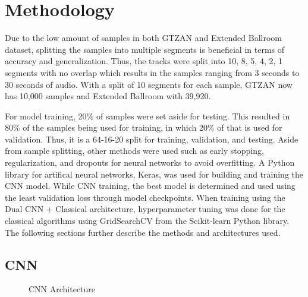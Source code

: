 \documentclass[10pt,twocolumn,letterpaper]{article}
\begin{document}
	\section{Methodology} %
	
	Due to the low amount of samples in both GTZAN and Extended Ballroom dataset, splitting the samples into multiple segments is beneficial in terms of accuracy and generalization. Thus, the tracks were split into 10, 8, 5, 4, 2, 1 segments with no overlap which results in the samples ranging from 3 seconds to 30 seconds of audio. With a split of 10 segments for each sample, GTZAN now has 10,000 samples and Extended Ballroom with 39,920. 
	
	For model training, 20\% of samples were set aside for testing. This resulted in 80\% of the samples being used for training, in which 20\% of that is used for validation. Thus, it is a 64-16-20 split for training, validation, and testing. Aside from sample splitting, other methods were used such as early stopping, regularization, and dropouts for neural networks to avoid overfitting. A Python library for artifical neural networks, Keras, was used for building and training the CNN model. While CNN training, the best model is determined and used using the least validation loss through model checkpoints. When training using the Dual CNN + Classical architecture, hyperparameter tuning was done for the classical algorithms using GridSearchCV from the Scikit-learn Python library. The following sections further describe the methods and architectures used.
	
	\subsection{CNN} %
	
	\begin{figure}[!htpb]
		\centering
		\caption{CNN Architecture}
		\label{fig:cnn}
	\end{figure}
	
\end{document}
